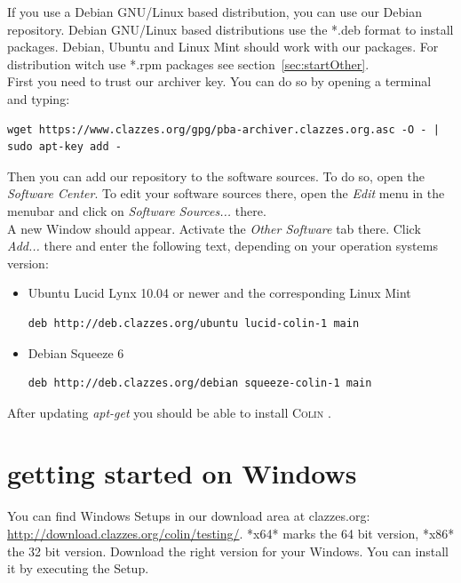 \documentclass[a4paper,11pt]{report}
\newcommand{\Colin}[0]{\textsc{Colin }}
\begin{document}
If you use a Debian GNU/Linux based distribution, you can use our Debian repository. Debian GNU/Linux based distributions use the *.deb format to install packages. Debian, Ubuntu and Linux Mint should work with our packages. For distribution witch use *.rpm packages see section~\ref{sec:startOther}.\\

First you need to trust our archiver key. You can do so by opening a terminal and typing:
\begin{lstlisting}[frame=single, breaklines=true, basicstyle=\small]
wget https://www.clazzes.org/gpg/pba-archiver.clazzes.org.asc -O - | sudo apt-key add - 
\end{lstlisting}
Then you can add our repository to the software sources. To do so, open the \textit{Software Center}. To edit your software sources there, open the \textit{Edit} menu in the menubar and click on \textit{Software  Sources...} there.\\
A new Window should appear. Activate the \textit{Other Software} tab there. Click \textit{Add...} there and enter the following text, depending on your operation systems version:

\begin{itemize}
	\item Ubuntu Lucid Lynx 10.04 or newer and the corresponding Linux Mint
\begin{lstlisting}[frame=single, breaklines=true, basicstyle=\small]
deb http://deb.clazzes.org/ubuntu lucid-colin-1 main  
\end{lstlisting}
	\item Debian Squeeze 6
\begin{lstlisting}[frame=single, breaklines=true, basicstyle=\small]
deb http://deb.clazzes.org/debian squeeze-colin-1 main
\end{lstlisting}
\end{itemize}

After updating \textit{apt-get} you should be able to install \Colin.



\section{getting started on Windows}
\label{sec:startWindows}

You can find Windows Setups in our download area at clazzes.org: \url{http://download.clazzes.org/colin/testing/}. *x64* marks the 64 bit version, *x86* the 32 bit version. Download the right version for your Windows. You can install it by executing the Setup. \\
\end{document}
